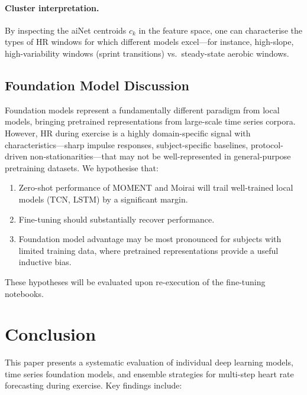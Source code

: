 \documentclass[11pt,a4paper]{article}
\begin{document}
\paragraph{Cluster interpretation.}
By inspecting the aiNet centroids $c_k$ in the feature space, one can
characterise the types of HR windows for which different models excel—for
instance, high-slope, high-variability windows (sprint transitions) vs.\
steady-state aerobic windows.

\subsection{Foundation Model Discussion}

Foundation models represent a fundamentally different paradigm from local
models, bringing pretrained representations from large-scale time series
corpora.  However, HR during exercise is a highly domain-specific signal with
characteristics—sharp impulse responses, subject-specific baselines,
protocol-driven non-stationarities—that may not be well-represented in
general-purpose pretraining datasets.  We hypothesise that:
\begin{enumerate}
  \item Zero-shot performance of MOMENT and Moirai will trail well-trained
        local models (TCN, LSTM) by a significant margin.
  \item Fine-tuning should substantially recover performance.
  \item Foundation model advantage may be most pronounced for subjects with
        limited training data, where pretrained representations provide a
        useful inductive bias.
\end{enumerate}
These hypotheses will be evaluated upon re-execution of the fine-tuning
notebooks.

\section{Conclusion}
\label{sec:conclusion}

This paper presents a systematic evaluation of individual deep learning models,
time series foundation models, and ensemble strategies for multi-step heart
rate forecasting during exercise.  Key findings include:
\end{document}
